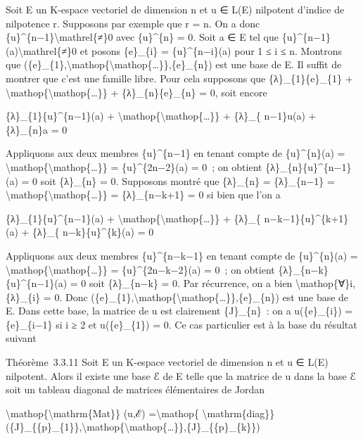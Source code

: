 \documentclass[]{article}
\begin{document}
Soit E un K-espace vectoriel de dimension n et u ∈ L(E) nilpotent
d'indice de nilpotence r. Supposons par exemple que r = n. On a donc
\{u\}\^{}\{n−1\}\textbackslash{}mathrel\{≠\}0 avec \{u\}\^{}\{n\} = 0.
Soit a ∈ E tel que \{u\}\^{}\{n−1\}(a)\textbackslash{}mathrel\{≠\}0 et
posons \{e\}\_\{i\} = \{u\}\^{}\{n−i\}(a) pour 1 ≤ i ≤ n. Montrons que
(\{e\}\_\{1\},\textbackslash{}mathop\{\textbackslash{}mathop\{\ldots{}\}\},\{e\}\_\{n\})
est une base de E. Il suffit de montrer que c'est une famille libre.
Pour cela supposons que \{λ\}\_\{1\}\{e\}\_\{1\} +
\textbackslash{}mathop\{\textbackslash{}mathop\{\ldots{}\}\} +
\{λ\}\_\{n\}\{e\}\_\{n\} = 0, soit encore

\{λ\}\_\{1\}\{u\}\^{}\{n−1\}(a) +
\textbackslash{}mathop\{\textbackslash{}mathop\{\ldots{}\}\} + \{λ\}\_\{
n−1\}u(a) + \{λ\}\_\{n\}a = 0

Appliquons aux deux membres \{u\}\^{}\{n−1\} en tenant compte de
\{u\}\^{}\{n\}(a) =
\textbackslash{}mathop\{\textbackslash{}mathop\{\ldots{}\}\} =
\{u\}\^{}\{2n−2\}(a) = 0~; on obtient \{λ\}\_\{n\}\{u\}\^{}\{n−1\}(a) =
0 soit \{λ\}\_\{n\} = 0. Supposons montré que \{λ\}\_\{n\} =
\{λ\}\_\{n−1\} =
\textbackslash{}mathop\{\textbackslash{}mathop\{\ldots{}\}\} =
\{λ\}\_\{n−k+1\} = 0 si bien que l'on a

\{λ\}\_\{1\}\{u\}\^{}\{n−1\}(a) +
\textbackslash{}mathop\{\textbackslash{}mathop\{\ldots{}\}\} + \{λ\}\_\{
n−k−1\}\{u\}\^{}\{k+1\}(a) + \{λ\}\_\{ n−k\}\{u\}\^{}\{k\}(a) = 0

Appliquons aux deux membres \{u\}\^{}\{n−k−1\} en tenant compte de
\{u\}\^{}\{n\}(a) =
\textbackslash{}mathop\{\textbackslash{}mathop\{\ldots{}\}\} =
\{u\}\^{}\{2n−k−2\}(a) = 0~; on obtient
\{λ\}\_\{n−k\}\{u\}\^{}\{n−1\}(a) = 0 soit \{λ\}\_\{n−k\} = 0. Par
récurrence, on a bien \textbackslash{}mathop\{∀\}i, \{λ\}\_\{i\} = 0.
Donc
(\{e\}\_\{1\},\textbackslash{}mathop\{\textbackslash{}mathop\{\ldots{}\}\},\{e\}\_\{n\})
est une base de E. Dans cette base, la matrice de u est clairement
\{J\}\_\{n\}~: on a u(\{e\}\_\{i\}) = \{e\}\_\{i−1\} si i ≥ 2 et
u(\{e\}\_\{1\}) = 0. Ce cas particulier est à la base du résultat
suivant

Théorème~3.3.11 Soit E un K-espace vectoriel de dimension n et u ∈ L(E)
nilpotent. Alors il existe une base ℰ de E telle que la matrice de u
dans la base ℰ soit un tableau diagonal de matrices élémentaires de
Jordan

\textbackslash{}mathop\{\textbackslash{}mathrm\{Mat\}\} (u,ℰ)
=\textbackslash{}mathop\{
\textbackslash{}mathrm\{diag\}\}(\{J\}\_\{\{p\}\_\{1\}\},\textbackslash{}mathop\{\textbackslash{}mathop\{\ldots{}\}\},\{J\}\_\{\{p\}\_\{k\}\})
\end{document}
